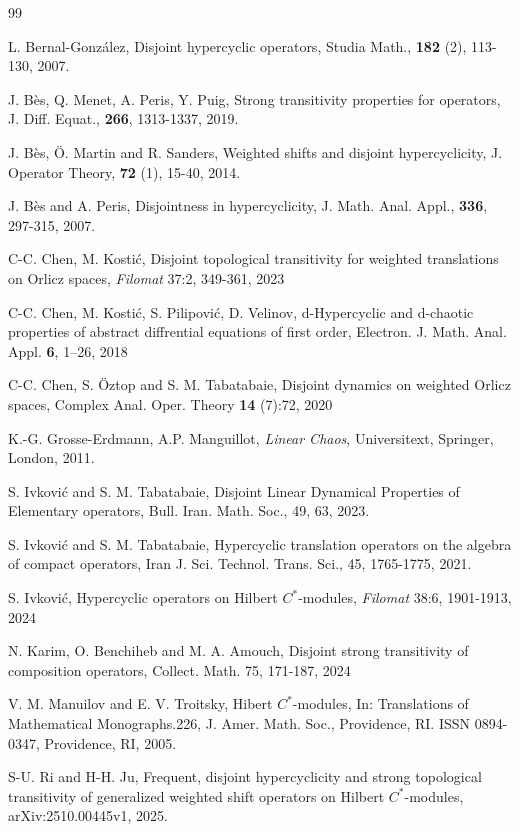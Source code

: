 \documentclass{article}
\begin{document}
\begin{thebibliography}{99}

\newblock L. Bernal-Gonz\'{a}lez,
\newblock Disjoint hypercyclic operators,
\newblock Studia Math., \textbf{182} (2), 113-130, 2007.

\newblock J. B\`{e}s, Q. Menet, A. Peris, Y. Puig,
\newblock Strong transitivity properties for operators,
\newblock J. Diff. Equat., \textbf{266}, 1313-1337, 2019.


\newblock J. B\`{e}s, \"{O}. Martin and R. Sanders,
\newblock Weighted shifts and disjoint hypercyclicity,
\newblock  J. Operator Theory, \textbf{72} (1), 15-40, 2014.

\newblock J. B\`{e}s and A. Peris,
\newblock Disjointness in hypercyclicity,
\newblock J. Math. Anal. Appl., \textbf{336}, 297-315, 2007.

\newblock C-C. Chen, M. Kosti\'{c},
\newblock Disjoint topological transitivity for weighted translations on Orlicz spaces,
\newblock \emph{Filomat} 37:2, 349-361, 2023 

\newblock C-C. Chen, M. Kosti\'{c}, S. Pilipovi\'{c}, D. Velinov,
\newblock d-Hypercyclic and d-chaotic properties of abstract diffrential equations of first order,
\newblock Electron. J. Math. Anal. Appl. \textbf{6}, 1–26, 2018

\newblock C-C. Chen, S. \"{O}ztop and S. M. Tabatabaie,
\newblock Disjoint dynamics on weighted Orlicz spaces,
\newblock Complex Anal. Oper. Theory \textbf{14} (7):72, 2020 


\newblock K.-G. Grosse-Erdmann, A.P. Manguillot,
\newblock \emph{Linear Chaos},
\newblock Universitext, Springer, London, 2011.

\newblock S. Ivkovi\'{c} and S. M. Tabatabaie,
\newblock Disjoint Linear Dynamical Properties of Elementary operators,
\newblock Bull. Iran. Math. Soc., 49, 63, 2023.

\newblock S. Ivkovi\'{c} and S. M. Tabatabaie,
\newblock Hypercyclic translation operators on the algebra of compact operators,
\newblock Iran J. Sci. Technol. Trans. Sci., 45, 1765-1775, 2021.

\newblock S. Ivkovi\'{c},
\newblock Hypercyclic operators on Hilbert $C^{\ast}$-modules,
\newblock \emph{Filomat} 38:6, 1901-1913, 2024


\newblock N. Karim, O. Benchiheb and M. A. Amouch,
\newblock Disjoint strong transitivity of composition operators,
\newblock Collect. Math. 75, 171-187, 2024

\newblock V. M. Manuilov and E. V. Troitsky,
\newblock Hibert $C^{\ast}$-modules,
\newblock In: Translations of Mathematical Monographs.226,
\newblock J. Amer. Math. Soc., Providence, RI. ISSN 0894-0347, Providence, RI, 2005.

\newblock S-U. Ri and H-H. Ju,
\newblock Frequent, disjoint hypercyclicity and strong topological transitivity of generalized weighted shift operators on Hilbert $C^{\ast}$-modules,
\newblock arXiv:2510.00445v1, 2025.

\end{thebibliography}
\end{document}
